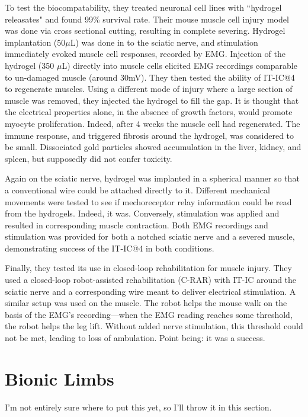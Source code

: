 To test the biocompatability, they treated neuronal cell lines with ``hydrogel releasates" and found 99\% survival rate. Their mouse muscle cell injury model was done via cross sectional cutting, resulting in complete severing. Hydrogel implantation (50$\mu$L) was done in to the sciatic nerve, and stimulation immediately evoked muscle cell responses, recorded by EMG. Injection of the hydrogel (350 $\mu$L) directly into muscle cells elicited EMG recordings comparable to un-damaged muscle (around 30mV). They then tested the ability of IT-IC@4 to regenerate muscles. Using a different mode of injury where a large section of muscle was removed, they injected the hydrogel to fill the gap. It is thought that the electrical properties alone, in the absence of growth factors, would promote myocyte proliferation. Indeed, after 4 weeks the muscle cell had regenerated. The immune response, and triggered fibrosis around the hydrogel, was considered to be small. Dissociated gold particles showed accumulation in the liver, kidney, and spleen, but supposedly did not confer toxicity.\newline

Again on the sciatic nerve, hydrogel was implanted in a spherical manner so that a conventional wire could be attached directly to it. Different mechanical movements were tested to see if mechoreceptor relay information could be read from the hydrogels. Indeed, it was. Conversely, stimulation was applied and resulted in corresponding muscle contraction. Both EMG recordings and stimulation was provided for both a notched sciatic nerve and a severed muscle, demonstrating success of the IT-IC@4 in both conditions.\newline

Finally, they tested its use in closed-loop rehabilitation for muscle injury. They used a closed-loop robot-assisted rehabilitation (C-RAR) with IT-IC around the sciatic nerve and a corresponding wire meant to deliver electrical stimulation. A similar setup was used on the muscle. The robot helps the mouse walk on the basis of the EMG's recording---when the EMG reading reaches some threshold, the robot helps the leg lift. Without added nerve stimulation, this threshold could not be met, leading to loss of ambulation. Point being: it was a success.


\section{Bionic Limbs}

I'm not entirely sure where to put this yet, so I'll throw it in this section. 


